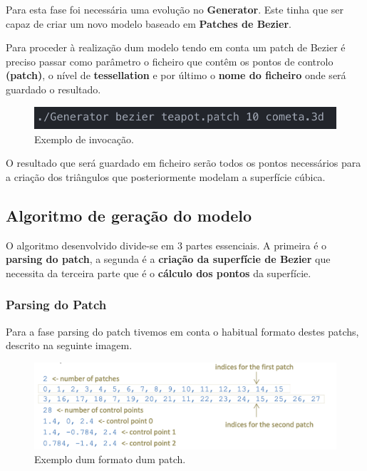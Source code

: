 \documentclass[a4paper]{article}
\begin{document}
Para esta fase foi necessária uma evolução no \textbf{Generator}. Este tinha que ser capaz de criar um novo modelo baseado em \textbf{Patches de Bezier}.

Para proceder à realização dum modelo tendo em conta um patch de Bezier é preciso passar como parâmetro o ficheiro que contêm os pontos de controlo  \textbf{(patch)}, o nível de \textbf{tessellation} e por último o \textbf{nome do ficheiro} onde será guardado o resultado.

\begin{figure}[H]
\centering
\includegraphics[scale=0.75]{bezier_command.png}
\caption{Exemplo de invocação.}
\label{img:bezier_command}
\end{figure}

O resultado que será guardado em ficheiro serão todos os pontos necessários para a criação dos triângulos que posteriormente modelam a superfície cúbica.

\subsection{Algoritmo de geração do modelo}
\label{sec:bezier}

O algoritmo desenvolvido divide-se em 3 partes essenciais. A primeira é o \textbf{parsing do patch}, a segunda é a \textbf{criação da superfície de Bezier} que necessita da terceira parte que é o \textbf{cálculo dos pontos} da superfície.

\subsubsection{Parsing do Patch}

Para a fase parsing do patch tivemos em conta o habitual formato destes patchs, descrito na seguinte imagem.

\begin{figure}[H]
\centering
\includegraphics[scale=0.65]{patch_format.png}
\caption{Exemplo dum formato dum patch.}
\label{img:bezier_command}
\end{figure}
\end{document}
